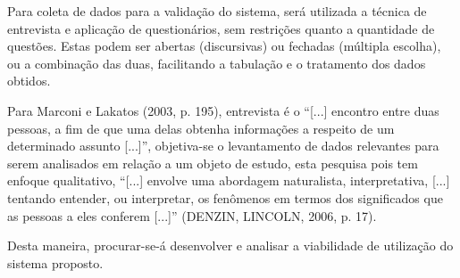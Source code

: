 \documentclass{IFNMG}
\begin{document}
Para coleta de dados para a validação do sistema, será utilizada a técnica de entrevista e aplicação de questionários, sem restrições quanto a quantidade de questões. Estas podem ser abertas (discursivas) ou fechadas (múltipla escolha), ou a combinação das duas, facilitando a tabulação e o tratamento dos dados obtidos.

Para Marconi e Lakatos (2003, p. 195), entrevista é o “[...] encontro entre duas pessoas, a fim de que uma delas obtenha informações a respeito de um determinado assunto [...]”, objetiva-se o levantamento de dados relevantes para serem analisados em relação a um objeto de estudo, esta pesquisa pois tem enfoque qualitativo, “[...] envolve uma abordagem naturalista, interpretativa, [...] tentando entender, ou interpretar, os fenômenos em termos dos significados que as pessoas a eles conferem [...]” (DENZIN, LINCOLN, 2006, p. 17).

Desta maneira, procurar-se-á desenvolver e analisar a viabilidade de utilização do sistema proposto.

\newpage
\end{document}
